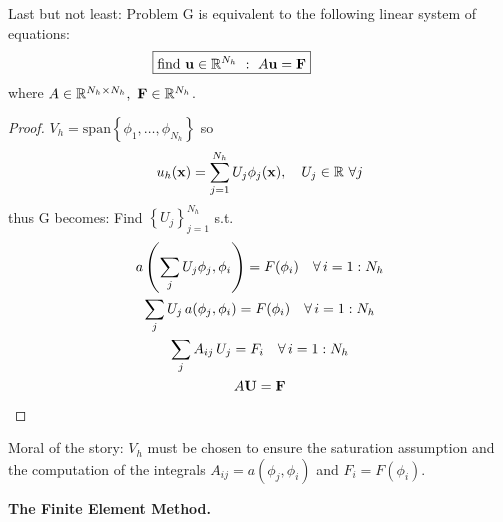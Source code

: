 Last but not least: Problem G is equivalent to the following linear system of equations:
\begin{equation*}
\boxed{\text{find } \mathbf{u}\in\mathbb{R}^{N_h}\ :\ A\mathbf{u}=\mathbf{F}}\qquad\qquad
\end{equation*}
where $A\in\RR^{N_h\times N_h},\ \Fv\in\RR^{N_h}$.

\begin{proof}
$V_h=\text{span}\left\{ \phi_1,\dots,\phi_{N_h} \right\}$ so
\begin{equation*}
u_h(\mathbf{x})=\sum_{j=1}^{N_h} U_j \phi_j(\mathbf{x}),\quad U_j\in\mathbb{R}\ \forall j
\end{equation*}
thus G becomes: Find $\left\{ U_j \right\}_{j=1}^{N_h}$ s.t.
\begin{gather*}
a\left( \sum_j U_j\phi_j,\phi_i \right)=F( \phi_i )\quad\forall\, i=1:N_h \\
\sum_j U_j\, a(\phi_j,\phi_i) = F(\phi_i)\quad\forall\, i=1:N_h \\
\sum_j A_{ij}\,U_j=F_i\quad\forall\, i=1:N_h \\
A\mathbf{U}=\mathbf{F}
\end{gather*}
\end{proof}

Moral of the story: $V_h$ must be chosen to ensure the saturation assumption and the computation of the integrals $A_{ij}=a(\phi_j,\phi_i)$ and $F_i=F(\phi_i)$.

\medskip

\textbf{The Finite Element Method.}

\bigskip

\bigskip

\bigskip

\bigskip

\bigskip

\bigskip

\bigskip

\bigskip

\bigskip

\bigskip

\bigskip

\bigskip

\bigskip

\bigskip

\bigskip

\bigskip

\bigskip

\bigskip

\bigskip

\bigskip

\bigskip

